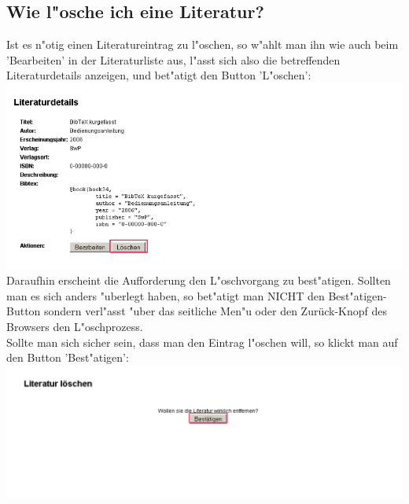 \subsection{Wie l"osche ich eine Literatur?}
Ist es n"otig einen Literatureintrag zu l"oschen, so w"ahlt man ihn wie auch beim 'Bearbeiten' in der Literaturliste aus, l"asst sich also die betreffenden Literaturdetails anzeigen, und bet"atigt den Button 'L"oschen':\\
\includegraphics[scale=0.8]{del_lit}\\
Daraufhin erscheint die Aufforderung den L"oschvorgang zu best"atigen. Sollten man es sich anders "uberlegt haben, so bet"atigt man NICHT den Best"atigen-Button sondern verl"asst "uber das seitliche Men"u oder den Zurück-Knopf des Browsers den L"oschprozess.\\
Sollte man sich sicher sein, dass man den Eintrag l"oschen will, so klickt man auf den Button 'Best"atigen':\\
\includegraphics[scale=0.8]{sure}\\


